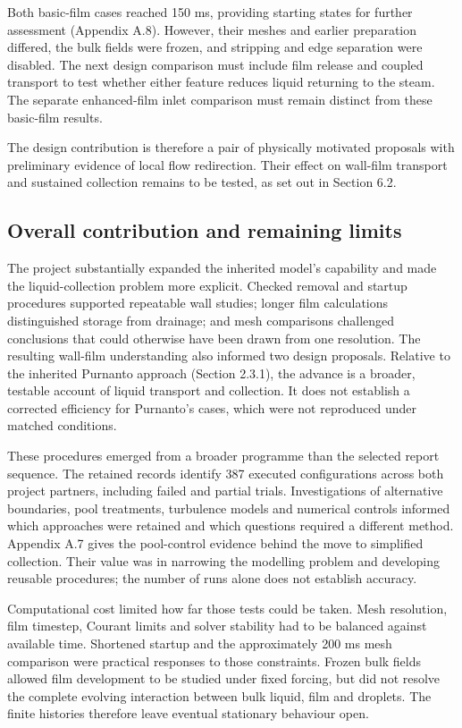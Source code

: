 \documentclass[12pt]{article}
\begin{document}
Both basic-film cases reached 150 ms, providing starting states for further assessment (Appendix A.8). However, their meshes and earlier preparation differed, the bulk fields were frozen, and stripping and edge separation were disabled. The next design comparison must include film release and coupled transport to test whether either feature reduces liquid returning to the steam. The separate enhanced-film inlet comparison must remain distinct from these basic-film results.

The design contribution is therefore a pair of physically motivated proposals with preliminary evidence of local flow redirection. Their effect on wall-film transport and sustained collection remains to be tested, as set out in Section 6.2.

\subsection{Overall contribution and remaining limits}\label{overall-contribution-and-remaining-limits}

The project substantially expanded the inherited model's capability and made the liquid-collection problem more explicit. Checked removal and startup procedures supported repeatable wall studies; longer film calculations distinguished storage from drainage; and mesh comparisons challenged conclusions that could otherwise have been drawn from one resolution. The resulting wall-film understanding also informed two design proposals. Relative to the inherited Purnanto approach (Section 2.3.1), the advance is a broader, testable account of liquid transport and collection. It does not establish a corrected efficiency for Purnanto's cases, which were not reproduced under matched conditions.

These procedures emerged from a broader programme than the selected report sequence. The retained records identify 387 executed configurations across both project partners, including failed and partial trials. Investigations of alternative boundaries, pool treatments, turbulence models and numerical controls informed which approaches were retained and which questions required a different method. Appendix A.7 gives the pool-control evidence behind the move to simplified collection. Their value was in narrowing the modelling problem and developing reusable procedures; the number of runs alone does not establish accuracy.

Computational cost limited how far those tests could be taken. Mesh resolution, film timestep, Courant limits and solver stability had to be balanced against available time. Shortened startup and the approximately 200 ms mesh comparison were practical responses to those constraints. Frozen bulk fields allowed film development to be studied under fixed forcing, but did not resolve the complete evolving interaction between bulk liquid, film and droplets. The finite histories therefore leave eventual stationary behaviour open.
\end{document}
